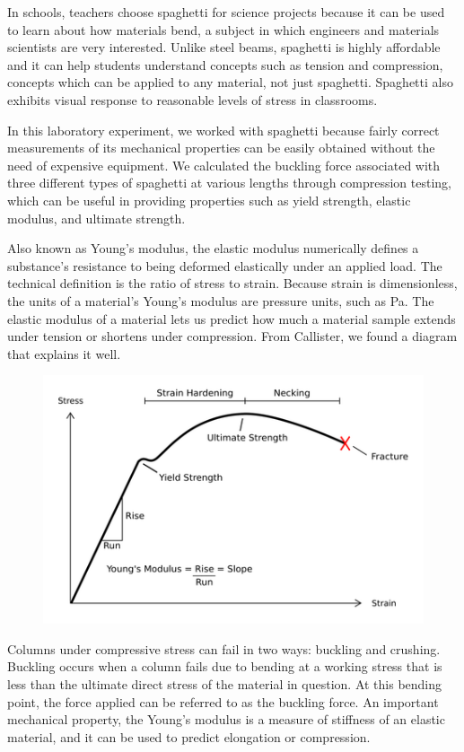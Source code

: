 \documentclass[12pt]{article}
\begin{document}
In schools, teachers choose spaghetti for science projects because it can be used to learn about how materials bend, a subject in which engineers and materials scientists are very interested. Unlike steel beams, spaghetti is highly affordable and it can help students understand concepts such as tension and compression, concepts which can be applied to any material, not just spaghetti. Spaghetti also exhibits visual response to reasonable levels of stress in classrooms.

In this laboratory experiment, we worked with spaghetti because fairly correct measurements of its mechanical properties can be easily obtained without the need of expensive equipment. We calculated the buckling force associated with three different types of spaghetti at various lengths through compression testing, which can be useful in providing properties such as yield strength, elastic modulus, and ultimate strength.

Also known as Young's modulus, the elastic modulus numerically defines a substance's resistance to being deformed elastically under an applied load. The technical definition is the ratio of stress to strain. Because strain is dimensionless, the units of a material's Young's modulus are pressure units, such as Pa. The elastic modulus of a material lets us predict how much a material sample extends under tension or shortens under compression. From Callister, we found a diagram that explains it well.

\begin{figure}[h]
	\centering
	\includegraphics[scale=0.3]{Lab1YM.png}
\end{figure}

Columns under compressive stress can fail in two ways: buckling and crushing. Buckling occurs when a column fails due to bending at a working stress that is less than the ultimate direct stress of the material in question. At this bending point, the force applied can be referred to as the buckling force. An important mechanical property, the Young's modulus is a measure of stiffness of an elastic material, and it can be used to predict elongation or compression.
\end{document}
